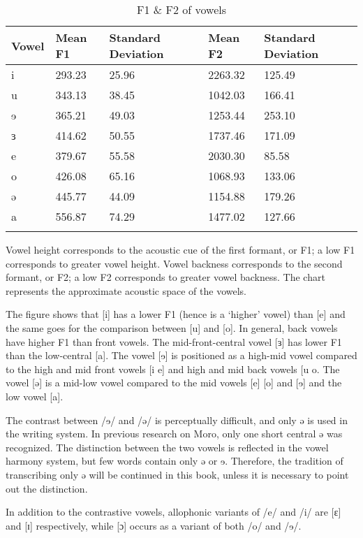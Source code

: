 \begin{table}
  \begin{tabular}{lllll}
    \lsptoprule
	Vowel &	Mean F1 &	Standard Deviation	&	Mean F2 &	Standard Deviation	\\
	\midrule
	i	&   293.23	&	25.96	&	2263.32	&	125.49 \\
	u	&	343.13	&	38.45	&	1042.03	&	166.41	\\
	ɘ	&	365.21	&	49.03	&	1253.44	&	253.10	\\
	ɜ	&	414.62	&	50.55	&	1737.46	&	171.09	\\
	e	&	379.67 	&	55.58	&	2030.30	&	  85.58	\\
	o	&	426.08 	&	65.16	&	1068.93	&	133.06	\\
	ə	&	445.77 	&	44.09	&	1154.88	&	179.26	\\	
	a	&	556.87 	&	74.29	&	1477.02	&	127.66	\\
\lspbottomrule
  \end{tabular}
  \caption{F1 \& F2 of vowels}
  \label{tab:ch2:2}
\end{table}

Vowel height corresponds to the acoustic cue of the first formant, or F1; a low F1 corresponds to greater vowel height. Vowel backness corresponds to the second formant, or F2; a low F2 corresponds to greater vowel backness. The chart represents the approximate acoustic space of the vowels. 

The figure shows that [i] has a lower F1 (hence is a ‘higher’ vowel) than [e] and the same goes for the comparison between [u] and [o]. In general, back vowels have higher F1 than front vowels. The mid-front-central vowel [ɜ] has lower F1 than the low-central [a]. The vowel [ɘ] is positioned as a high-mid vowel compared to the high and mid front vowels [i e] and high and mid back vowels [u o. The vowel [ə] is a mid-low vowel compared to the mid vowels [e] [o] and [ɘ] and the low vowel [a]. 

The contrast between /ɘ/ and /ə/ is perceptually difficult, and only ə is used in the writing system. In previous research on Moro, only one short central ə was recognized. The distinction between the two vowels is reflected in the vowel harmony system, but few words contain only ə or ɘ. Therefore, the tradition of transcribing only ə will be continued in this book, unless it is necessary to point out the distinction.    

In addition to the contrastive vowels, allophonic variants of /e/ and /i/ are [ɛ] and [ɪ] respectively, while [ɔ] occurs as a variant of both /o/ and /ɘ/. 

